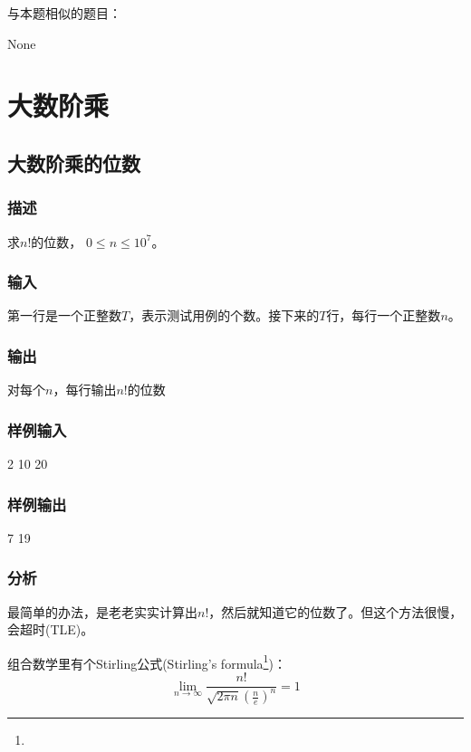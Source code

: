 与本题相似的题目：
\begindot
\item  None
\myenddot


\section{大数阶乘} %

\subsection{大数阶乘的位数} %
\subsubsection{描述}
求$n!$的位数， $0 \leq n \leq 10^7$。

\subsubsection{输入}
第一行是一个正整数$T$，表示测试用例的个数。接下来的$T$行，每行一个正整数$n$。

\subsubsection{输出}
对每个$n$，每行输出$n!$的位数

\subsubsection{样例输入}
\begin{Code}
2
10
20
\end{Code}

\subsubsection{样例输出}
\begin{Code}
7
19
\end{Code}

\subsubsection{分析}
最简单的办法，是老老实实计算出$n!$，然后就知道它的位数了。但这个方法很慢，会超时(TLE)。

组合数学里有个Stirling公式(Stirling's formula\footnote{})：
$$
\lim_{n \to \infty}{\dfrac{n!}{\sqrt{2\pi n}\left(\frac{n}{e} \right)^n}}=1
$$

